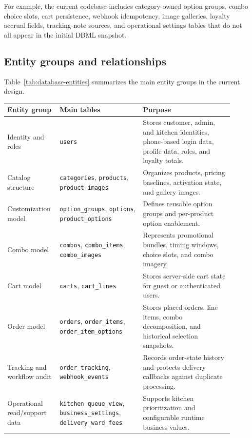 For example, the current codebase includes category-owned option groups, combo choice slots, cart persistence, webhook idempotency, image galleries, loyalty accrual fields, tracking-note sources, and operational settings tables that do not all appear in the initial DBML snapshot.

\subsection{Entity groups and relationships}

Table~\ref{tab:database-entities} summarizes the main entity groups in the current design.

\begingroup
\small
\setlength{\LTpre}{0.4em}
\setlength{\LTpost}{0.8em}
\label{tab:database-entities}
\begin{tabular}{L{0.19\linewidth} L{0.35\linewidth} L{0.38\linewidth}}
\toprule
\textbf{Entity group} & \textbf{Main tables} & \textbf{Purpose} \\
\midrule
Identity and roles & \texttt{users} & Stores customer, admin, and kitchen identities, phone-based login data, profile data, roles, and loyalty totals. \\
Catalog structure & \texttt{categories}, \texttt{products}, \texttt{product\_images} & Organizes products, pricing baselines, activation state, and gallery images. \\
Customization model & \texttt{option\_groups}, \texttt{options}, \texttt{product\_options} & Defines reusable option groups and per-product option enablement. \\
Combo model & \texttt{combos}, \texttt{combo\_items}, \texttt{combo\_images} & Represents promotional bundles, timing windows, choice slots, and combo imagery. \\
Cart model & \texttt{carts}, \texttt{cart\_lines} & Stores server-side cart state for guest or authenticated users. \\
Order model & \texttt{orders}, \texttt{order\_items}, \texttt{order\_item\_options} & Stores placed orders, line items, combo decomposition, and historical selection snapshots. \\
Tracking and workflow audit & \texttt{order\_tracking}, \texttt{webhook\_events} & Records order-state history and protects delivery callbacks against duplicate processing. \\
Operational read/support data & \texttt{kitchen\_queue\_view}, \texttt{business\_settings}, \texttt{delivery\_ward\_fees} & Supports kitchen prioritization and configurable runtime business values. \\
\bottomrule
\end{tabular}
\endgroup

